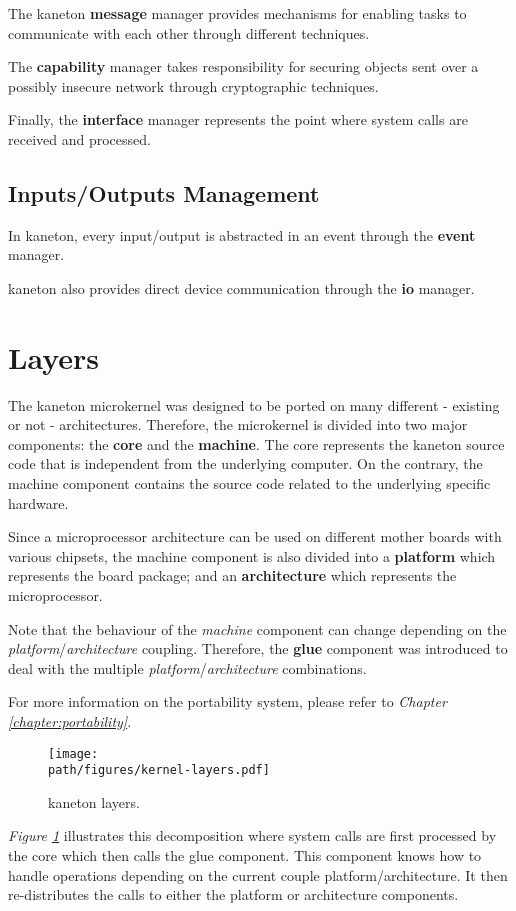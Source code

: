 The kaneton \textbf{message} manager provides mechanisms for enabling tasks
to communicate with each other through different techniques.

The \textbf{capability} manager takes responsibility for securing objects
sent over a possibly insecure network through cryptographic techniques.

Finally, the \textbf{interface} manager represents the point where system
calls are received and processed.


\subsection*{Inputs/Outputs Management}

In kaneton, every input/output is abstracted in an event through the
\textbf{event} manager.

kaneton also provides direct device communication through the \textbf{io}
manager.

%
%

\section{Layers}

The kaneton microkernel was designed to be ported on many different - existing
or not - architectures. Therefore, the microkernel is divided into two
major components: the \textbf{core} and the \textbf{machine}. The core
represents the kaneton source code that is independent from the underlying
computer. On the contrary, the machine component contains the source code
related to the underlying specific hardware.

Since a microprocessor architecture can be used on different mother boards
with various chipsets, the machine component is also divided into a
\textbf{platform} which represents the board package; and an
\textbf{architecture} which represents the microprocessor.

Note that the behaviour of the \textit{machine} component can change depending
on the \textit{platform}/\textit{architecture} coupling. Therefore, the
\textbf{glue} component was introduced to deal with the multiple
\textit{platform}/\textit{architecture} combinations.

For more information on the portability system, please refer to
\textit{Chapter \ref{chapter:portability}}.

\begin{figure}[h]
  \begin{center}
    \texttt{[image: \\path/figures/kernel-layers.pdf]}
    \caption{kaneton layers.}
    \label{figure:kernel-layers}
  \end{center}
\end{figure}

\textit{Figure \ref{figure:kernel-layers}} illustrates this decomposition where
system calls are first processed by the core which then calls the glue
component. This component knows how to handle operations depending on the
current couple platform/architecture. It then re-distributes the calls to
either the platform or architecture components.
